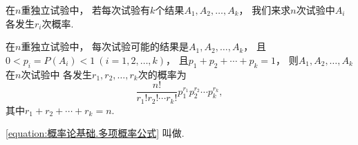 在\(n\)重独立试验中，
若每次试验有\(k\)个结果\(A_1,A_2,\dotsc,A_k\)，
我们来求\(n\)次试验中\(A_i\)各发生\(r_i\)次概率.

\begin{theorem}[多项概率]
在\(n\)重独立试验中，
每次试验可能的结果是\(A_1,A_2,\dotsc,A_k\)，
且\(0 < p_i = P(A_i) < 1\ (i=1,2,\dotsc,k)\)，
且\(p_1+p_2+\dotsb+p_k=1\)，
则\(A_1,A_2,\dotsc,A_k\)在\(n\)次试验中
各发生\(r_1,r_2,\dotsc,r_k\)次的概率为
\begin{equation}\label{equation:概率论基础.多项概率公式}
	\frac{n!}{r_1! r_2! \dotsm r_k!}
	p_1^{r_1} p_2^{r_2} \dotsm p_k^{r_k},
\end{equation}
其中\(r_1+r_2+\dotsb+r_k=n\).
\end{theorem}
\cref{equation:概率论基础.多项概率公式}
叫做.
